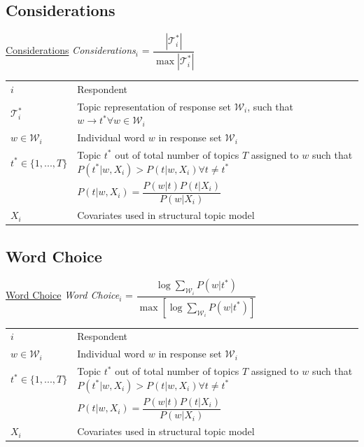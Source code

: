 \subsection{Considerations}
\begin{frame}{\hyperlink{components}{Considerations}}\label{elaboration}\centering
\emph{Considerations}$_i$ = $\dfrac{|\mathcal{T}^*_i|}{\max|\mathcal{T}^*_i|}$
\vspace{1em}\\
\begin{tabular}{lp{8.5cm}}
\toprule
$i$ & Respondent \\
$\mathcal{T}^*_i $ & Topic representation of response set $\mathcal{W}_i$, such that $w\rightarrow t^*\forall w \in \mathcal{W}_i$ \\
$w \in \mathcal{W}_i$ & Individual word $w$ in response set $\mathcal{W}_i$\\

$t^* \in \{1,...,T\} $ & Topic $t^*$ out of total number of topics $T$ assigned to $w$ such that $P(t^*|w,X_i) > P(t|w,X_i) \forall t\neq t^*$\\
& $P(t|w,X_i)=\dfrac{P(w|t)P(t|X_i)}{P(w|X_i)}$ \\
$X_i$ & Covariates used in structural topic model
\end{tabular}
\end{frame}

\subsection{Word Choice}
\begin{frame}{\hyperlink{components}{Word Choice}}\label{eloquence}\centering
\emph{Word Choice$_i$} = $\dfrac{\log\sum_{\mathcal{W}_i} P(w|t^*)}{\max\left[\log\sum_{\mathcal{W}_i} P(w|t^*)\right]}$
\vspace{1em}\\
\begin{tabular}{lp{8.5cm}}
\toprule
$i$ & Respondent \\
$w \in \mathcal{W}_i$ & Individual word $w$ in response set $\mathcal{W}_i$\\
$t^* \in \{1,...,T\} $ & Topic $t^*$ out of total number of topics $T$ assigned to $w$ such that $P(t^*|w,X_i) > P(t|w,X_i) \forall t\neq t^*$\\
& $P(t|w,X_i)=\dfrac{P(w|t)P(t|X_i)}{P(w|X_i)}$ \\
$X_i$ & Covariates used in structural topic model
\end{tabular}
\end{frame}


